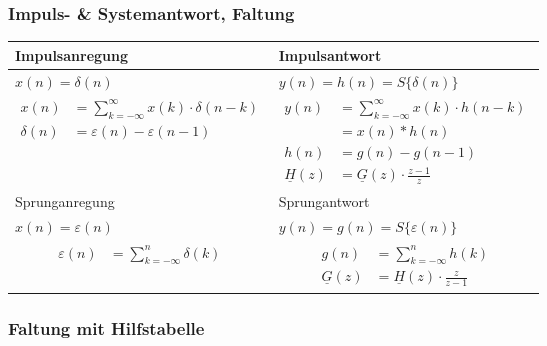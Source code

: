 \subsubsection{Impuls- \& Systemantwort, Faltung}
\small
\begin{centering}
\begin{tabularx}{\columnwidth}{|X|X|}
	\hline
	Impulsanregung & Impulsantwort\\
	\hline
	$x(n)=\delta(n)$ & $y(n)= h(n) = S\{ \delta(n) \}$ \\
	\hline
	{
	\begin{align*}
		x(n) &= \sum_{k=-\infty}^{\infty}x(k) \cdot \delta(n-k)\\
		\delta(n) &= \varepsilon(n)-\varepsilon(n-1)
	\end{align*}
	}	 &
	{
	\begin{align*}	
		y(n) &= \sum_{k=-\infty}^{\infty}x(k) \cdot h(n-k)\\
		&= x(n) * h(n)\\
		h(n) &= g(n)-g(n-1)\\
		\underline{H}(z)&=\underline{G}(z)\cdot \frac{z-1}{z}
	\end{align*}
	}	\\
	\hline\hline
	Sprunganregung & Sprungantwort \\
	\hline
	$x(n)=\varepsilon(n)$ & $y(n)= g(n) = S\{ \varepsilon(n) \}$ \\
	\hline
	{
		\begin{align*}	
			\varepsilon(n) &= \sum_{k=-\infty}^{n} \delta(k)
		\end{align*}
	} &
	{
		\begin{align*}	
			g(n) &= \sum_{k=-\infty}^{n} h(k)\\
					\underline{G}(z)&=\underline{H}(z)\cdot \frac{z}{z-1}
		\end{align*}
	}	\\
	\hline
	\end{tabularx}
\end{centering}
\normalsize
\subsubsection{Faltung mit Hilfstabelle}

